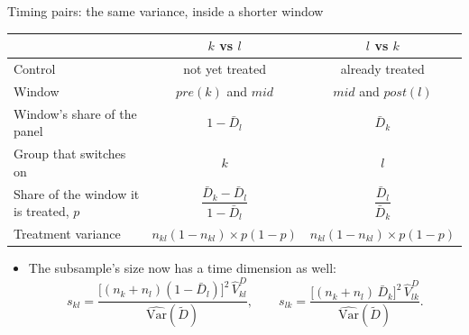 \documentclass[
  11pt,
  ignorenonframetext,
  aspectratio=169,
]{beamer}
\providecommand{\tightlist}{%
  \setlength{\itemsep}{0pt}\setlength{\parskip}{0pt}}
\begin{document}
\begin{frame}{Timing pairs: the same variance, inside a shorter window}
\protect{}\label{timing-pairs-the-same-variance-inside-a-shorter-window}
\begin{center}\small
\begin{tabular}{lcc}
\toprule
 & $k$ vs $l$ & $l$ vs $k$ \\
\midrule
Control & not yet treated & already treated \\
Window & $pre(k)$ and $mid$ & $mid$ and $post(l)$ \\
Window's share of the panel & $1 - \bar D_l$ & $\bar D_k$ \\
Group that switches on & $k$ & $l$ \\
Share of the window it is treated, $p$ & $\dfrac{\bar D_k - \bar D_l}{1 - \bar D_l}$ & $\dfrac{\bar D_l}{\bar D_k}$ \\[8pt]
Treatment variance & $n_{kl}(1 - n_{kl}) \times p(1-p)$ & $n_{kl}(1 - n_{kl}) \times p(1-p)$ \\
\bottomrule
\end{tabular}
\end{center}

\begin{itemize}
\tightlist
\item
  The subsample's size now has a time dimension as well: \[
  s_{kl} = \frac{\big[(n_k + n_l)(1 - \bar D_l)\big]^2\, \hat V^{D}_{kl}}{\widehat{\text{Var}}(\tilde D)}, \qquad s_{lk} = \frac{\big[(n_k + n_l)\,\bar D_k\big]^2\, \hat V^{D}_{lk}}{\widehat{\text{Var}}(\tilde D)} .
  \]
\end{itemize}
\end{frame}
\end{document}
